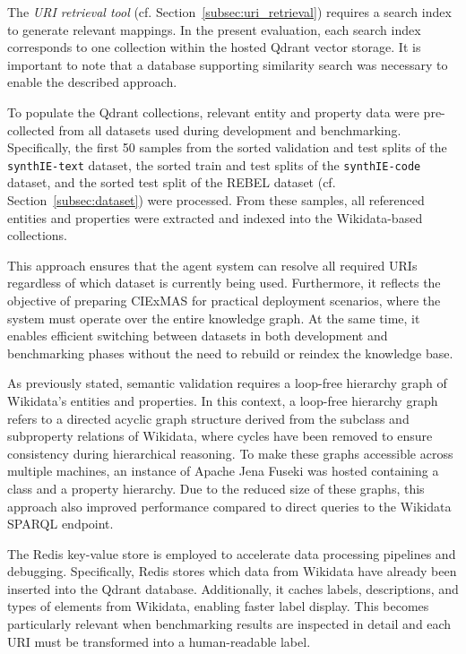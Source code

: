 \documentclass[a4paper,oneside,bibliography=totoc]{scrbook}
\begin{document}
The \textit{URI retrieval tool} (cf. Section~\ref{subsec:uri_retrieval}) requires a search index to generate relevant mappings. In the present evaluation, each search index corresponds to one collection within the hosted Qdrant vector storage. It is important to note that a database supporting similarity search was necessary to enable the described approach.

To populate the Qdrant collections, relevant entity and property data were pre-collected from all datasets used during development and benchmarking. Specifically, the first 50 samples from the sorted validation and test splits of the \texttt{synthIE-text} dataset, the sorted train and test splits of the \texttt{synthIE-code} dataset, and the sorted test split of the REBEL dataset (cf. Section~\ref{subsec:dataset}) were processed. From these samples, all referenced entities and properties were extracted and indexed into the Wikidata-based collections.

This approach ensures that the agent system can resolve all required URIs regardless of which dataset is currently being used. Furthermore, it reflects the objective of preparing CIExMAS for practical deployment scenarios, where the system must operate over the entire knowledge graph. At the same time, it enables efficient switching between datasets in both development and benchmarking phases without the need to rebuild or reindex the knowledge base.

As previously stated, semantic validation requires a loop-free hierarchy graph of Wikidata’s entities and properties. In this context, a loop-free hierarchy graph refers to a directed acyclic graph structure derived from the subclass and subproperty relations of Wikidata, where cycles have been removed to ensure consistency during hierarchical reasoning. To make these graphs accessible across multiple machines, an instance of Apache Jena Fuseki was hosted containing a class and a property hierarchy. Due to the reduced size of these graphs, this approach also improved performance compared to direct queries to the Wikidata \ac{SPARQL} endpoint.

The Redis key-value store is employed to accelerate data processing pipelines and debugging. Specifically, Redis stores which data from Wikidata have already been inserted into the Qdrant database. Additionally, it caches labels, descriptions, and types of elements from Wikidata, enabling faster label display. This becomes particularly relevant when benchmarking results are inspected in detail and each URI must be transformed into a human-readable label.
\end{document}
